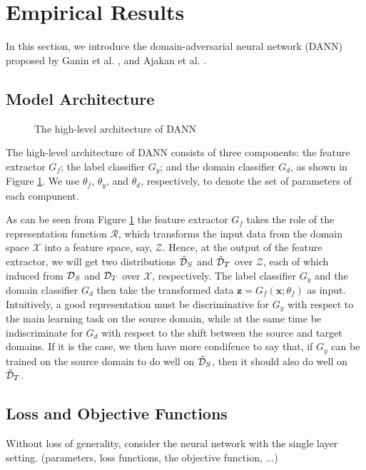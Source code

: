 \section{Empirical Results}
In this section, we introduce the domain-adversarial neural network (DANN) proposed by Ganin et al. \cite{Ganin2016}, \cite{Ganin2015} and Ajakan et al. \cite{Ajakan2014}.

\subsection{Model Architecture}
\begin{figure}
  \centering
  
  \caption{The high-level architecture of DANN}
  \label{fig:dann_arch}
\end{figure}

The high-level architecture of DANN consists of three components: the feature extractor $G_f$; the label classifier $G_y$; and the domain classifier $G_d$, as shown in Figure \ref{fig:dann_arch}. We use $\theta_f$, $\theta_y$, and $\theta_d$, respectively, to denote the set of parameters of each compunent.

As can be seen from Figure \ref{fig:dann_arch} the feature extractor $G_f$ takes the role of the representation function $\mathcal{R}$, which transforms the input data from the domain space $\mathcal{X}$ into a feature space, say, $\mathcal{Z}$. Hence, at the output of the feature extractor, we will get two distributions $\tilde{\mathcal{D}}_S$ and $\tilde{\mathcal{D}}_T$ over $\mathcal{Z}$, each of which induced from $\mathcal{D}_S$ and $\mathcal{D}_T$ over $\mathcal{X}$, respectively. The label classifier $G_y$ and the domain classifier $G_d$ then take the transformed data $\mathbf{z}=G_f(\mathbf{x};\theta_f)$ as input. Intuitively, a good representation must be discriminative for $G_y$ with respect to the main learning task on the source domain, while at the same time be indiscriminate for $G_d$ with respect to the shift between the source and target domains. If it is the case, we then have more condifence to say that, if $G_y$ can be trained on the source domain to do well on $\tilde{\mathcal{D}}_S$, then it should also do well on $\tilde{\mathcal{D}}_T$.

\subsection{Loss and Objective Functions}
Without loss of generality, consider the neural network with the single layer setting. (parameters, loss functions, the objective function, ...)

